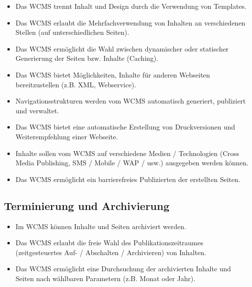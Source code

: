 \begin{itemize}
\item
Das WCMS trennt Inhalt und Design durch die Verwendung von Templates.
\item
Das WCMS erlaubt die Mehrfachverwendung von Inhalten an verschiedenen Stellen (auf unterschiedlichen Seiten).
\item
Das WCMS ermöglicht die Wahl zwischen dynamischer oder statischer Generierung der Seiten bzw. Inhalte (Caching).
\item
Das WCMS bietet Möglichkeiten, Inhalte für anderen Webseiten bereitzustellen (z.B. XML, Webservice).
\item
Navigationsstrukturen werden vom WCMS automatisch generiert, publiziert und verwaltet.
\item
Das WCMS bietet eine automatische Erstellung von Druckversionen und Weiterempfehlung einer Webseite.
\item
Inhalte sollen vom WCMS auf verschiedene Medien / Technologien (Cross Media Publishing, SMS / Mobile / WAP / usw.) ausgegeben werden können.
\item
Das WCMS ermöglicht ein barrierefreies Publizierten der erstellten Seiten.
\end{itemize}


\subsection{Terminierung und Archivierung}
\label{sec:archi}
\begin{itemize}
\item
Im WCMS können Inhalte und Seiten archiviert werden.
\item
Das WCMS erlaubt die freie Wahl des Publikationszeitraumes (zeitgesteuertes Auf- / Abschalten / Archivieren) von Inhalten.
\item
Das WCMS ermöglicht eine Durchsuchung der archivierten Inhalte und Seiten nach wählbaren Parametern (z.B. Monat oder Jahr).
\end{itemize}


